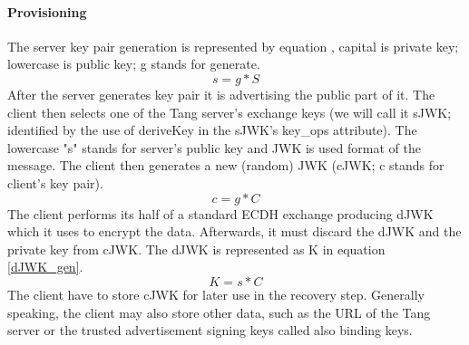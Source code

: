 \paragraph{Provisioning}
The server key pair generation is represented by equation \label{servergen}, capital is private key; lowercase is public key; g stands for generate.
\begin{equation}\label{servergen}
    s = g * S
\end{equation}
After the server generates key pair it is advertising the public part of it.
The client then selects one of the Tang server's exchange keys (we will call it sJWK; identified by the use of deriveKey in the sJWK's key\_ops attribute).
The lowercase "s" stands for server's public key and JWK is used format of the message.
The client then generates a new (random) JWK (cJWK; c stands for client's key pair).
\begin{equation}\label{clientgen}
    c = g * C
\end{equation}
The client performs its half of a standard ECDH exchange producing dJWK which it uses to encrypt the data.
Afterwards, it must discard the dJWK and the private key from cJWK.
The dJWK is represented as K in equation \ref{dJWK_gen}.
\begin{equation}\label{dJWK_gen}
    K = s * C
\end{equation}
The client have to store cJWK for later use in the recovery step.
Generally speaking, the client may also store other data, such as the URL of the Tang server or the trusted advertisement signing keys called also binding keys.



